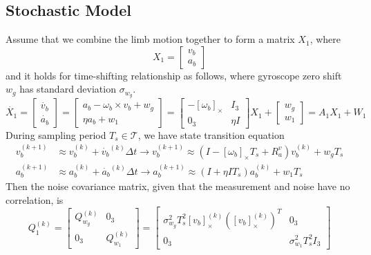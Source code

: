 \documentclass[12pt]{article}
\begin{document}
    \subsection{Stochastic Model}
    Assume that we combine the limb motion together to form a matrix $X_1$, where
    \begin{equation}
        X_1 = \begin{bmatrix}
            v_b \\ a_b
        \end{bmatrix}
    \end{equation}
    and it holds for time-shifting relationship as follows, where gyroscope zero shift $w_g$ has standard deviation $\sigma_{w_g}$.
    \begin{equation}
        \dot{X_1} = \begin{bmatrix}
            \dot{v_b} \\ \dot{a_b}
        \end{bmatrix} = \begin{bmatrix}
            a_b - \omega_b \times v_b + w_g\\
            \eta a_b + w_1
        \end{bmatrix} = \begin{bmatrix}
            -[\omega_b]_{\times} & I_3 \\
            0_3 & \eta I 
        \end{bmatrix}X_1+ \begin{bmatrix}
            w_g \\ w_1
        \end{bmatrix} = A_1X_1 + W_1
    \end{equation}
    During sampling period $T_s \in \mathcal{T}$, we have state transition equation
    \begin{equation}
    \begin{aligned}
        v_b^{(k+1)} &\approx v_b^{(k)} + \dot{v_b}^{(k)} \Delta t \rightarrow v_b^{(k+1)} \approx \left( I - [\omega_b]_{\times} T_s + R_a^v\right) v_b^{(k)} + w_g T_s
        \\a_b^{(k+1)} &\approx a_b^{(k)} + \dot{a_b}^{(k)} \Delta t \rightarrow a_b^{(k+1)} \approx (I + \eta I T_s) a_b^{(k)} + w_1 T_s
    \end{aligned}
    \end{equation}
    Then the noise covariance matrix, given that the measurement and noise have no correlation, is
    \begin{equation}
        Q_1^{(k)} = \begin{bmatrix}
            Q_{w_g}^{(k)} & 0_3 \\ 0_3 & Q_{w_1}^{(k)}
        \end{bmatrix} = \begin{bmatrix}
            \sigma_{w_g}^2 T_s^2 [v_b]_\times^{(k)} \left( [v_b]_\times^{(k)} \right)^T & 0_3 \\
            0_3 & \sigma_{w_1}^2 T_s^2 I_3
        \end{bmatrix}
    \end{equation}
\end{document}
